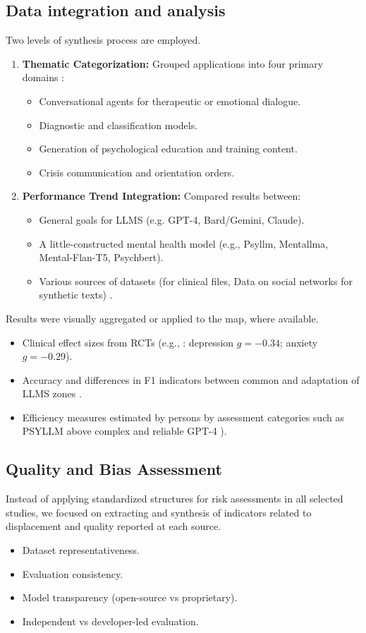 \documentclass[sn-basic,authoryear]{sn-jnl}
\begin{document}
\subsection{Data integration and analysis}
Two levels of synthesis process are employed.
\begin{enumerate}
    \item \textbf{Thematic Categorization:} Grouped applications into four primary domains \cite{Hua2024b,JMIR2024}:
    \begin{itemize}
        \item Conversational agents for therapeutic or emotional dialogue.
        \item Diagnostic and classification models.
        \item Generation of psychological education and training content.
        \item Crisis communication and orientation orders.
    \end{itemize}
    \item \textbf{Performance Trend Integration:} Compared results between:
    \begin{itemize}
        \item General goals for LLMS (e.g. GPT-4, Bard/Gemini, Claude).
        \item A little-constructed mental health model (e.g., Psyllm, Mentallma, Mental-Flan-T5, Psychbert).
        \item Various sources of datasets (for clinical files, Data on social networks for synthetic texts) \cite{Roy2025}.
    \end{itemize}
\end{enumerate}

Results were visually aggregated or applied to the map, where available.
\begin{itemize}
    \item Clinical effect sizes from RCTs (e.g., \cite{Zhong2024}: depression $g = -0.34$; anxiety $g = -0.29$).
    \item Accuracy and differences in F1 indicators between common and adaptation of LLMS zones \cite{Hu2025}.
    \item Efficiency measures estimated by persons by assessment categories such as PSYLLM above complex and reliable GPT-4  \cite{Hu2025}).
\end{itemize}

\subsection{Quality and Bias Assessment}
Instead of applying standardized structures for risk assessments in all selected studies, we focused on extracting and synthesis of indicators related to displacement and quality reported at each source.
\begin{itemize}
    \item Dataset representativeness.
    \item Evaluation consistency.
    \item Model transparency (open-source vs proprietary).
    \item Independent vs developer-led evaluation.
\end{itemize}
\end{document}
